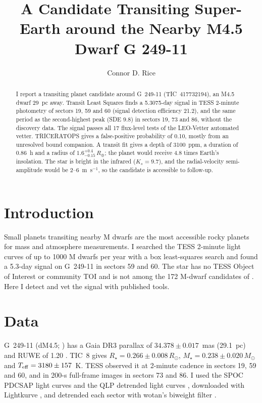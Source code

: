 \documentclass{aastex701}
\begin{document}
\title{A Candidate Transiting Super-Earth around the Nearby M4.5 Dwarf G 249-11}

\author{Connor D. Rice}

\begin{abstract}
I report a transiting planet candidate around G~249-11 (TIC~417732194), an M4.5 dwarf
29~pc away. Transit Least Squares finds a 5.3075-day signal in TESS 2-minute photometry
of sectors 19, 59 and 60 (signal detection efficiency 21.2), and the same period as the
second-highest peak (SDE 9.8) in sectors 19, 73 and 86, without the discovery data. The
signal passes all 17 flux-level tests of the LEO-Vetter automated vetter. TRICERATOPS
gives a false-positive
probability of 0.10, mostly from an unresolved bound companion. A transit fit gives a
depth of 3100~ppm, a duration of 0.86~h and a radius of $1.6^{+0.4}_{-0.15}\,R_\oplus$;
the planet would receive 4.8 times Earth's insolation. The star is bright in the
infrared ($K_s=9.7$), and the radial-velocity semi-amplitude would be
2--6~m~s$^{-1}$, so the candidate is accessible to follow-up.
\end{abstract}


\section{Introduction}

Small planets transiting nearby M dwarfs are the most accessible rocky planets for mass
and atmosphere measurements. I searched the TESS \citep{Ricker2015} 2-minute light curves
of up to 1000 M dwarfs per year with a box least-squares search \citep{Kovacs2002} and
found a 5.3-day signal on G~249-11 in sectors 59 and 60. The star has no TESS Object of
Interest or community TOI and is not among the 172 M-dwarf candidates of
\citet{Kunimoto2025}. Here I detect and vet the signal with published tools.

\section{Data}

G~249-11 (dM4.5; \citealt{Hejazi2022}) has a Gaia DR3 parallax of $34.378\pm0.017$~mas
(29.1~pc) and RUWE of 1.20 . TIC~8 \citep{Stassun2019} gives
$R_\star=0.266\pm0.008\,R_\odot$, $M_\star=0.238\pm0.020\,M_\odot$ and
$T_{\rm eff}=3180\pm157$~K. TESS observed it at 2-minute cadence in sectors 19, 59 and 60,
and in 200-s full-frame images in sectors 73 and 86. I used the SPOC PDCSAP light curves
\citep{Jenkins2016} and the QLP detrended light curves \citep[cadences with QUALITY
$=0$;][]{Huang2020}, downloaded with Lightkurve , and detrended
each sector with wotan's biweight filter \citep[0.75-day window;][]{Hippke2019wotan}.
\end{document}
